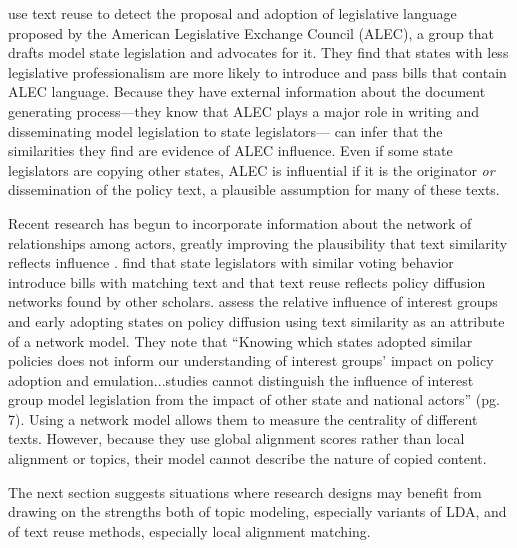 \documentclass{article}
\begin{document}
\citet{Hertel-Fernandez} use text reuse to detect the proposal and adoption of legislative language proposed by the American Legislative Exchange Council (ALEC), a group that drafts model state legislation and advocates for it. They find that states with less legislative professionalism are more likely to introduce and pass bills that contain ALEC language. Because they have external information about the document generating process---they know that ALEC plays a major role in writing and disseminating model legislation to state legislators---\citet{Hertel-Fernandez} can infer that the similarities they find are evidence of ALEC influence. Even if some state legislators are copying other states, ALEC is influential if it is the originator \textit{or} dissemination of the policy text, a plausible assumption for many of these texts.

Recent research has begun to incorporate information about the network of relationships among actors, greatly improving the plausibility that text similarity reflects influence .
\citet{Linder2017} find that state legislators with similar voting behavior introduce bills with matching text and that text reuse reflects policy diffusion networks found by other scholars. 
\citet{Garrett2015} assess the relative influence of interest groups and early adopting states on policy diffusion using text similarity as an attribute of a network model. They note that ``Knowing which states adopted similar policies does not inform our understanding of interest groups' impact on policy adoption and emulation...studies cannot distinguish the influence of interest group model legislation from the impact of other state and national actors'' (pg. 7). Using a network model allows them to measure the centrality of different texts.  However, because they use global alignment scores rather than local alignment or topics, their model cannot describe the nature of copied content. 

The next section suggests situations where research designs may benefit from drawing on the strengths both of topic modeling, especially variants of LDA, and of text reuse methods, especially local alignment matching.



\end{document}
